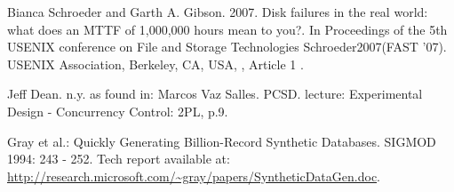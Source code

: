 \documentclass[12pt,a4paper]{article}
\begin{document}
\begin{thebibliography}{1}

 Bianca Schroeder and Garth A. Gibson. 2007. Disk failures in the real world: what does an MTTF of 1,000,000 hours mean to you?. In Proceedings of the 5th USENIX conference on File and Storage Technologies Schroeder2007(FAST '07). USENIX Association, Berkeley, CA, USA, , Article 1 .

 Jeff Dean. n.y. as found in: Marcos Vaz Salles. PCSD. lecture: Experimental Design - Concurrency Control: 2PL, p.9.

 Gray et al.: Quickly Generating Billion-Record Synthetic Databases. SIGMOD 1994: 243 - 252. Tech report available at: \url{http://research.microsoft.com/~gray/papers/SyntheticDataGen.doc}.

\end{thebibliography}
\end{document}
